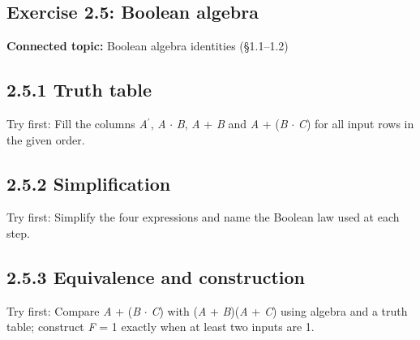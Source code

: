 \documentclass[11pt]{article}
\begin{document}
\begin{keepsection}
\section{Exercise 2.5: Boolean algebra}

\textbf{Connected topic:} Boolean algebra identities (§1.1–1.2)

\begin{keepsection}
\subsection{2.5.1 Truth table}

Try first: Fill the columns \textit{A}\ensuremath{{}^{\prime}}, \textit{A} \ensuremath{\cdot} \textit{B}, \textit{A} + \textit{B} and \textit{A} + (\textit{B} \ensuremath{\cdot} \textit{C}) for all input rows in the given order.

\end{keepsection}

\begin{keepsection}
\subsection{2.5.2 Simplification}

Try first: Simplify the four expressions and name the Boolean law used at each step.

\end{keepsection}

\begin{keepsection}
\subsection{2.5.3 Equivalence and construction}

Try first: Compare \textit{A} + (\textit{B} \ensuremath{\cdot} \textit{C}) with (\textit{A} + \textit{B})(\textit{A} + \textit{C}) using algebra and a truth table; construct \textit{F} = 1 exactly when at least two inputs are 1.

\end{keepsection}
\end{keepsection}
\end{document}
